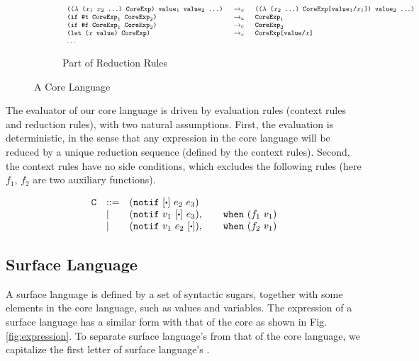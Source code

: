 \begin{figure*}[t]
\begin{subfigure}{0.99\linewidth}
	\[
{\footnotesize
		\begin{array}{lcl}
		\texttt{(($\lambda$~($x_1$~$x_2$~...)~CoreExp)~$\mbox{\tt value}_1$~$\mbox{\tt value}_2$~...)} &~\rightarrow_c~& \texttt{(($\lambda$~($x_2$~...)~CoreExp[$\mbox{\tt value}_1$/$x_1$])~$\mbox{\tt value}_2$~...)}\\

		\texttt{(if~$\mbox{\tt \#t}$~$\mbox{\tt CoreExp}_1$~$\mbox{\tt CoreExp}_2$)}&~\rightarrow_c~& \texttt{$\mbox{\tt CoreExp}_1$}\\
		\texttt{(if~$\mbox{\tt \#f}$~$\mbox{\tt CoreExp}_1$~$\mbox{\tt CoreExp}_2$)}&~\rightarrow_c~& \texttt{$\mbox{\tt CoreExp}_2$}\\
		\texttt{(let~($x$~$\mbox{\tt value}$)~CoreExp)}&~\rightarrow_c~&\texttt{CoreExp[\mbox{\tt value}/$x$]}\\
		\ldots&&
		\end{array}
}
\]
	\caption{Part of Reduction Rules}
\end{subfigure}


\caption{A Core Language}
\label{fig:core}
\end{figure*}

The evaluator of our core language is driven by evaluation rules (context rules and reduction rules), with two natural assumptions. First, the evaluation is deterministic, in the sense that any expression in the core language will be reduced by a unique reduction sequence (defined by the context rules). Second, the context rules have no side conditions, which excludes the following rules (here $f_1$, $f_2$ are two auxiliary functions).

{\footnotesize
\[
\begin{array}{lll}
\m{C}& ::= & (\m{notif}~[\bigcdot]~e_2~e_3)\\
&|& (\m{notif}~v_1~[\bigcdot]~e_3), \qquad \m{when}~(f_1~v_1)\\
&|& (\m{notif}~v_1~e_2~[\bigcdot]), \qquad \m{when}~(f_2~v_1)
\end{array}
\]}


\subsection{Surface Language}
\label{mark:suflang}

A surface language is defined by a set of syntactic sugars, together with some elements in the core language, such as values and variables. The expression of a surface language has a similar form with that of the core as shown in Fig.  \ref{fig:expression}. To separate surface language's  from that of the core language, we capitalize the first letter of surface language's .


